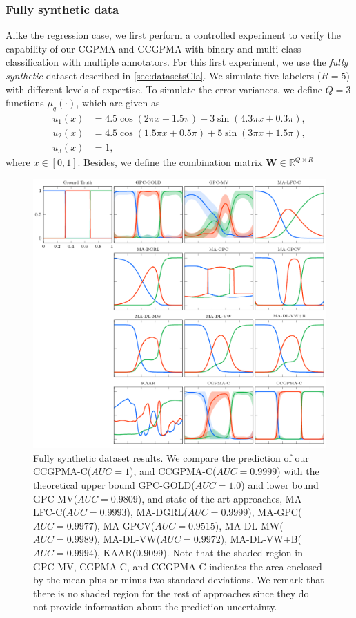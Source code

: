 \documentclass[journal]{IEEEtran}
\newcommand{\Real}{\mathbb{R}}
\newcommand{\boldW}{\mathbf{W}}
\begin{document}
\subsubsection{Fully synthetic data} Alike the regression case, we first perform a controlled experiment to verify the capability of our CGPMA and CCGPMA with binary and multi-class classification with multiple annotators. For this first experiment, we use the \textit{fully synthetic} dataset described in \cref{sec:datasetsCla}. We simulate five labelers ($R=5$) with different levels of expertise. To simulate the error-variances, we define $Q=3$ functions $\mu_q(\cdot)$, which are given as 
\begin{align}
\label{eq:u1c}
u_1(x) &= 4.5\cos(2\pi x + 1.5\pi) - 3\sin(4.3\pi x + 0.3\pi),\\
\label{eq:u2c}
u_2(x) &= 4.5\cos(1.5\pi x + 0.5\pi) + 5\sin(3\pi x + 1.5\pi),\\
\label{eq:u3c}
u_3(x) &= 1,
\end{align}
where $x\in [0,1]$. Besides, we define the combination matrix $\boldW \in \Real^{Q\times R}$
\begin{figure}[!tb]
	\centering
% 	
	\includegraphics[width = \textwidth]{Figures/SinCla.pdf}
	\caption{Fully synthetic dataset results. We compare the prediction of our CCGPMA-C($AUC=1$), and CCGPMA-C($AUC=0.9999$) with the theoretical upper bound GPC-GOLD($AUC=1.0$) and lower bound GPC-MV($AUC=0.9809$), and state-of-the-art approaches, MA-LFC-C($AUC=0.9993$), MA-DGRL($AUC=0.9999$),  MA-GPC($AUC=0.9977$), MA-GPCV($AUC=0.9515$), MA-DL-MW($AUC=0.9989$), MA-DL-VW($AUC=0.9972$), MA-DL-VW+B($AUC=0.9994$), KAAR($0.9099$). Note that the shaded region in GPC-MV, CGPMA-C, and CCGPMA-C indicates the area enclosed by the mean plus or minus two standard deviations. We remark that there is no shaded region for the rest of approaches since they do not provide information about the prediction uncertainty.}
	\label{fig:FSCla}
\end{figure}
\end{document}
